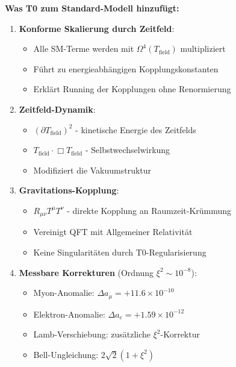 	\textbf{Was T0 zum Standard-Modell hinzufügt:}
	
	\begin{tcolorbox}[colback=blue!5!white,colframe=blue!75!black,title=T0-Beiträge zur erweiterten Lagrange-Dichte]
		\begin{enumerate}
			\item \textbf{Konforme Skalierung durch Zeitfeld}:
			\begin{itemize}
				\item Alle SM-Terme werden mit $\Omega^4(T_{\text{field}})$ multipliziert
				\item Führt zu energieabhängigen Kopplungskonstanten
				\item Erklärt Running der Kopplungen ohne Renormierung
			\end{itemize}
			
			\item \textbf{Zeitfeld-Dynamik}:
			\begin{itemize}
				\item $(\partial T_{\text{field}})^2$ - kinetische Energie des Zeitfelds
				\item $T_{\text{field}} \cdot \Box T_{\text{field}}$ - Selbstwechselwirkung
				\item Modifiziert die Vakuumstruktur
			\end{itemize}
			
			\item \textbf{Gravitations-Kopplung}:
			\begin{itemize}
				\item $R_{\mu\nu} T^{\mu} T^{\nu}$ - direkte Kopplung an Raumzeit-Krümmung
				\item Vereinigt QFT mit Allgemeiner Relativität
				\item Keine Singularitäten durch T0-Regularisierung
			\end{itemize}
			
			\item \textbf{Messbare Korrekturen} (Ordnung $\xi^2 \sim 10^{-8}$):
			\begin{itemize}
				\item Myon-Anomalie: $\Delta a_{\mu} = +11.6 \times 10^{-10}$
				\item Elektron-Anomalie: $\Delta a_{e} = +1.59 \times 10^{-12}$
				\item Lamb-Verschiebung: zusätzliche $\xi^2$-Korrektur
				\item Bell-Ungleichung: $2\sqrt{2}(1 + \xi^2)$
			\end{itemize}
		\end{enumerate}
	\end{tcolorbox}
	
